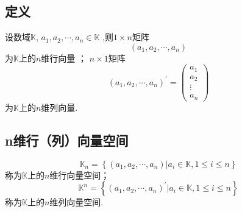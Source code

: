 \subsection{定义}
\begin{formal}
\begin{definition}[$n$维行（列）向量]\label{def:n维行（列）向量}
    设数域$\mathbb{K}$,
    $a_1,a_2,\cdots,a_n \in \mathbb{K}$
    ,则$1 \times n$矩阵
    \[
    \left(a_1,a_2,\cdots,a_n\right)
    \]
    为$\mathbb{K}$上的$n$维行向量
    ；
    $n \times 1$矩阵\[
    \left(a_1,a_2,\cdots,a_n\right)^{\prime}
    =
    \begin{pmatrix}
        a_1 \\
        a_2 \\
        \vdots\\
        a_n
    \end{pmatrix}
    \]
    为$\mathbb{K}$上的$n$维列向量.
\end{definition}
\end{formal}
\subsection{n维行（列）向量空间}
\begin{formal}
\begin{definition}[$n$维行（列）向量空间]\label{def:n维行（列）向量空间}
    \[
    \mathbb{K}_n = \left\{
        \left(a_1,a_2,\cdots,a_n\right)
        | a_i \in \mathbb{K},
        1\leqslant i\leqslant n
    \right\}
    \]
    称为$\mathbb{K}$上的$n$维行向量空间；
    \[
    \mathbb{K}^n = \left\{
        \left(a_1,a_2,\cdots,a_n\right)^{\prime}
        | a_i \in \mathbb{K},
        1\leqslant i\leqslant n
    \right\}
    \]
    称为$\mathbb{K}$上的$n$维列向量空间.
\end{definition}\end{formal}

